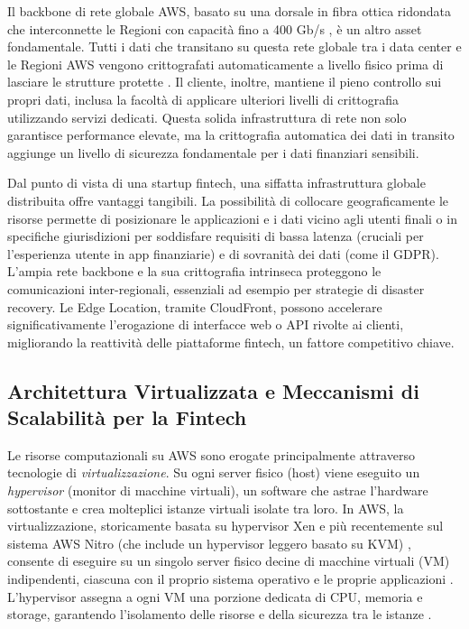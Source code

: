 Il backbone di rete globale AWS, basato su una dorsale in fibra ottica ridondata che interconnette le Regioni con capacità fino a 400 Gb/s \cite{aws-network}, è un altro asset fondamentale. Tutti i dati che transitano su questa rete globale tra i data center e le Regioni AWS vengono crittografati automaticamente a livello fisico prima di lasciare le strutture protette \cite{aws-network}. Il cliente, inoltre, mantiene il pieno controllo sui propri dati, inclusa la facoltà di applicare ulteriori livelli di crittografia utilizzando servizi dedicati. Questa solida infrastruttura di rete non solo garantisce performance elevate, ma la crittografia automatica dei dati in transito aggiunge un livello di sicurezza fondamentale per i dati finanziari sensibili.

Dal punto di vista di una startup fintech, una siffatta infrastruttura globale distribuita offre vantaggi tangibili. La possibilità di collocare geograficamente le risorse permette di posizionare le applicazioni e i dati vicino agli utenti finali o in specifiche giurisdizioni per soddisfare requisiti di bassa latenza (cruciali per l'esperienza utente in app finanziarie) e di sovranità dei dati (come il GDPR). L'ampia rete backbone e la sua crittografia intrinseca proteggono le comunicazioni inter-regionali, essenziali ad esempio per strategie di disaster recovery. Le Edge Location, tramite CloudFront, possono accelerare significativamente l'erogazione di interfacce web o API rivolte ai clienti, migliorando la reattività delle piattaforme fintech, un fattore competitivo chiave.

\subsection{Architettura Virtualizzata e Meccanismi di Scalabilità per la Fintech}
\label{sec:virtualization-scalability-fintech}

Le risorse computazionali su AWS sono erogate principalmente attraverso tecnologie di \textit{virtualizzazione}. Su ogni server fisico (host) viene eseguito un \textit{hypervisor} (monitor di macchine virtuali), un software che astrae l'hardware sottostante e crea molteplici istanze virtuali isolate tra loro. In AWS, la virtualizzazione, storicamente basata su hypervisor Xen e più recentemente sul sistema AWS Nitro (che include un hypervisor leggero basato su KVM) \cite{aws-nitro-hypervisor}, consente di eseguire su un singolo server fisico decine di macchine virtuali (VM) indipendenti, ciascuna con il proprio sistema operativo e le proprie applicazioni \cite{ibm_iaas}. L'hypervisor assegna a ogni VM una porzione dedicata di CPU, memoria e storage, garantendo l'isolamento delle risorse e della sicurezza tra le istanze \cite{ibm_iaas}.

